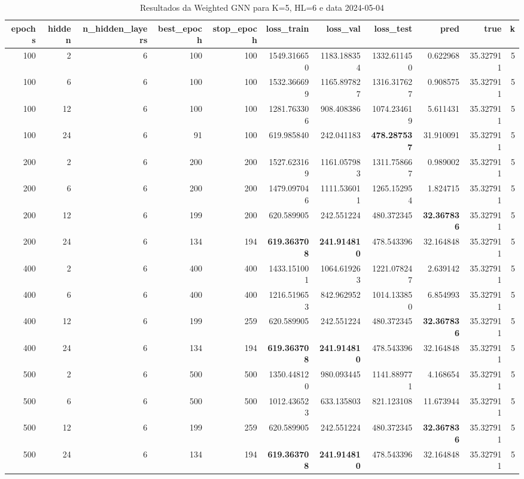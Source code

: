 \begin{table}
\caption{Resultados da Weighted GNN para K=5, HL=6 e data 2024-05-04}
\label{tab:weighted_gnn_results_k5_hl6_d20240504}
\begin{tabular}{rrrrrrrrrrr}
\toprule
epochs & hidden & n\_hidden\_layers & best\_epoch & stop\_epoch & loss\_train & loss\_val & loss\_test & pred & true & k \\
\midrule
100 & 2 & 6 & 100 & 100 & 1549.316650 & 1183.188354 & 1332.611450 & 0.622968 & 35.327911 & 5 \\
100 & 6 & 6 & 100 & 100 & 1532.366699 & 1165.897827 & 1316.317627 & 0.908575 & 35.327911 & 5 \\
100 & 12 & 6 & 100 & 100 & 1281.763306 & 908.408386 & 1074.234619 & 5.611431 & 35.327911 & 5 \\
100 & 24 & 6 & 91 & 100 & 619.985840 & 242.041183 & \textbf{478.287537} & 31.910091 & 35.327911 & 5 \\
200 & 2 & 6 & 200 & 200 & 1527.623169 & 1161.057983 & 1311.758667 & 0.989002 & 35.327911 & 5 \\
200 & 6 & 6 & 200 & 200 & 1479.097046 & 1111.536011 & 1265.152954 & 1.824715 & 35.327911 & 5 \\
200 & 12 & 6 & 199 & 200 & 620.589905 & 242.551224 & 480.372345 & \textbf{32.367836} & 35.327911 & 5 \\
200 & 24 & 6 & 134 & 194 & \textbf{619.363708} & \textbf{241.914810} & 478.543396 & 32.164848 & 35.327911 & 5 \\
400 & 2 & 6 & 400 & 400 & 1433.151001 & 1064.619263 & 1221.078247 & 2.639142 & 35.327911 & 5 \\
400 & 6 & 6 & 400 & 400 & 1216.519653 & 842.962952 & 1014.133850 & 6.854993 & 35.327911 & 5 \\
400 & 12 & 6 & 199 & 259 & 620.589905 & 242.551224 & 480.372345 & \textbf{32.367836} & 35.327911 & 5 \\
400 & 24 & 6 & 134 & 194 & \textbf{619.363708} & \textbf{241.914810} & 478.543396 & 32.164848 & 35.327911 & 5 \\
500 & 2 & 6 & 500 & 500 & 1350.448120 & 980.093445 & 1141.889771 & 4.168654 & 35.327911 & 5 \\
500 & 6 & 6 & 500 & 500 & 1012.436523 & 633.135803 & 821.123108 & 11.673944 & 35.327911 & 5 \\
500 & 12 & 6 & 199 & 259 & 620.589905 & 242.551224 & 480.372345 & \textbf{32.367836} & 35.327911 & 5 \\
500 & 24 & 6 & 134 & 194 & \textbf{619.363708} & \textbf{241.914810} & 478.543396 & 32.164848 & 35.327911 & 5 \\

\end{tabular}
\end{table}
